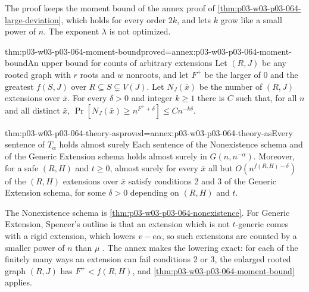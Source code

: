 The proof keeps the moment bound of the annex proof of
\cref{thm:p03-w03-p03-064-large-deviation}, which holds for every order
\(2k\), and lets \(k\) grow like a small power of \(n\).  The exponent
\(\lambda\) is not optimized.

\begin{hblemma}{thm:p03-w03-p03-064-moment-bound}{proved=annex:p03-w03-p03-064-moment-bound}{An upper bound for counts of arbitrary extensions}
Let \((R,J)\) be any rooted graph with \(r\) roots and \(w\) nonroots, and
let \(F^+\) be the larger of \(0\) and the greatest \(f(S,J)\) over
\(R\subseteq S\subsetneq V(J)\).  Let \(N_J(\bar x)\) be the number of
\((R,J)\) extensions over \(\bar x\).  For every \(\delta>0\) and integer
\(k\geq1\) there is \(C\) such that, for all \(n\) and all distinct
\(\bar x\), \(\Pr[N_J(\bar x)\geq n^{F^++\delta}]\leq Cn^{-k\delta}\).
\end{hblemma}

\begin{hbtheorem}{thm:p03-w03-p03-064-theory-as}{proved=annex:p03-w03-p03-064-theory-as}{Every sentence of \(T_\alpha\) holds almost surely}
Each sentence of the Nonexistence schema and of the Generic Extension schema
holds almost surely in \(G(n,n^{-\alpha})\).  Moreover, for a safe
\((R,H)\) and \(t\geq0\), almost surely for every \(\bar x\) all but
\(O(n^{f(R,H)-\delta})\) of the \((R,H)\) extensions over \(\bar x\) satisfy
conditions 2 and 3 of the Generic Extension schema, for some \(\delta>0\)
depending on \((R,H)\) and \(t\).
\end{hbtheorem}

The Nonexistence schema is \cref{thm:p03-w03-p03-064-nonexistence}.  For
Generic Extension, Spencer's outline is that an extension which is not
\(t\)-generic comes with a rigid extension, which lowers \(v-e\alpha\), so
such extensions are counted by a smaller power of \(n\) than \(\mu\)
\cite[p.~11]{Spencer2007LogicRandomStructuresAuthor}.  The annex makes the
lowering exact: for each of the finitely many ways an extension can fail
conditions 2 or 3, the enlarged rooted graph \((R,J)\) has
\(F^+<f(R,H)\), and \cref{thm:p03-w03-p03-064-moment-bound} applies.

